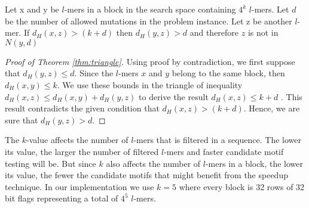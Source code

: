 \begin{thm} \label{thm:triangle}
	Let x and y be $l$-mers in a block in the search space containing $4^k$ $l$-mers. Let $d$ be the number of allowed mutations in the problem instance. Let z be another $l$-mer. If $d_H(x, z) > (k + d)$ then $d_H(y, z) > d$ and therefore $z$ is not in $N(y, d)$
\end{thm}

\begin{proof}[Proof of Theorem \ref{thm:triangle}]
Using proof by contradiction, we first suppose that $d_H(y, z) \leq d$. Since the $l$-mers $x$ and $y$ belong to the same block, then $d_H(x, y) \leq k$. We use these bounds in the triangle of inequality $d_H(x, z) \leq d_H(x, y) + d_H(y, z)$ to derive the result $d_H(x, z) \leq k + d$ . This result contradicts the given condition that $d_H(x, z) > (k + d)$. Hence, we are sure that $d_H(y, z) > d$.
\end{proof}



The $k$-value affects the number of $l$-mers that is filtered in a sequence. The lower its value, the larger the number of filtered $l$-mers and faster candidate motif testing will be. But since $k$ also affects the number of $l$-mers in a block, the lower its value, the fewer the candidate motifs that might benefit from the speedup technique. In our implementation we use $k = 5$ where every block is 32 rows of 32 bit flags representing a total of $4^5$ $l$-mers.

